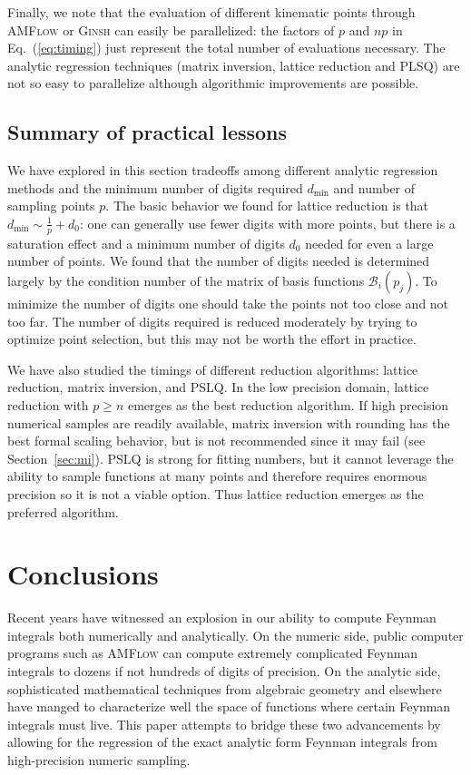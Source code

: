 \documentclass[a4paper,11pt]{article}
\newcommand{\cB}{ {\mathcal B} }
\newcommand{\dmin}{d_{\text{min}}}
\begin{document}
 Finally, we note that the evaluation of different kinematic points through \textsc{AMFlow} or \textsc{Ginsh} can easily be parallelized: the factors of $p$ and $np$ in Eq.~(\ref{eq:timing}) just represent the total number of evaluations necessary. The analytic regression techniques (matrix inversion, lattice reduction and PLSQ) are not so easy to parallelize although algorithmic improvements are possible. 





\subsection{Summary of practical lessons}
We have explored in this section tradeoffs among different analytic regression methods and the minimum number of digits required $\dmin$ and number of sampling points $p$. The basic behavior we found for lattice reduction is that $\dmin \sim \frac{1}{p}+ d_0$: one can generally use fewer digits with more points, but there is a saturation effect and a minimum number of digits $d_0$ needed for even a large number of points. We found that the number of digits needed is determined largely by the condition number of the matrix of basis functions $\cB_i(p_j)$. To minimize the number of digits one should take the points not too close and not too far. The number of digits required is reduced moderately by trying to optimize point selection, but this may not be worth the effort in practice. 


We have also studied the timings of different reduction algorithms: lattice reduction, matrix inversion, and PSLQ. In the low precision domain, lattice reduction with $p\geq n $ emerges as the best reduction algorithm. If high precision numerical samples are readily available, matrix inversion with rounding has the best formal scaling behavior, but is not recommended since it may fail (see Section~\ref{sec:mi}). PSLQ is strong for fitting numbers, but it cannot leverage the ability to sample functions at many points and therefore requires enormous precision so it is not a viable option. Thus lattice reduction emerges as the preferred algorithm. 

\section{Conclusions}
\label{sec:conclusion}
Recent years have witnessed an explosion in our ability to compute Feynman integrals both numerically and analytically. On the numeric side, public computer programs such as  \textsc{AMFlow} can compute extremely complicated Feynman integrals to dozens if not hundreds of digits of precision. On the analytic side, sophisticated mathematical techniques from algebraic geometry and elsewhere have manged to 
characterize well the space of functions where certain Feynman integrals must live. This paper attempts to bridge these two advancements by allowing for the regression of the exact analytic form Feynman integrals from high-precision numeric sampling.
\end{document}
